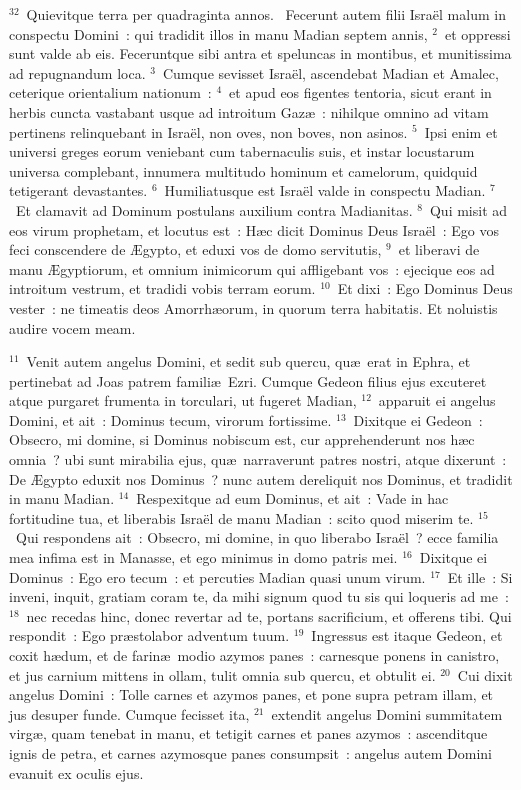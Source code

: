 ${}^{32}$~Quievitque terra per quadraginta annos.
~Fecerunt autem filii Isra\"el malum in conspectu Domini~: qui tradidit illos in manu Madian septem annis,
${}^{2}$~et oppressi sunt valde ab eis. Feceruntque sibi antra et speluncas in montibus, et munitissima ad repugnandum loca.
${}^{3}$~Cumque sevisset Isra\"el, ascendebat Madian et Amalec, ceterique orientalium nationum~:
${}^{4}$~et apud eos figentes tentoria, sicut erant in herbis cuncta vastabant usque ad introitum Gaz\ae~: nihilque omnino ad vitam pertinens relinquebant in Isra\"el, non oves, non boves, non asinos.
${}^{5}$~Ipsi enim et universi greges eorum veniebant cum tabernaculis suis, et instar locustarum universa complebant, innumera multitudo hominum et camelorum, quidquid tetigerant devastantes.
${}^{6}$~Humiliatusque est Isra\"el valde in conspectu Madian.
${}^{7}$~Et clamavit ad Dominum postulans auxilium contra Madianitas.
${}^{8}$~Qui misit ad eos virum prophetam, et locutus est~: H\ae c dicit Dominus Deus Isra\"el~: Ego vos feci conscendere de \AE gypto, et eduxi vos de domo servitutis,
${}^{9}$~et liberavi de manu \AE gyptiorum, et omnium inimicorum qui affligebant vos~: ejecique eos ad introitum vestrum, et tradidi vobis terram eorum.
${}^{10}$~Et dixi~: Ego Dominus Deus vester~: ne timeatis deos Amorrh\ae orum, in quorum terra habitatis. Et noluistis audire vocem meam.


${}^{11}$~Venit autem angelus Domini, et sedit sub quercu, qu\ae\ erat in Ephra, et pertinebat ad Joas patrem famili\ae\ Ezri. Cumque Gedeon filius ejus excuteret atque purgaret frumenta in torculari, ut fugeret Madian,
${}^{12}$~apparuit ei angelus Domini, et ait~: Dominus tecum, virorum fortissime.
${}^{13}$~Dixitque ei Gedeon~: Obsecro, mi domine, si Dominus nobiscum est, cur apprehenderunt nos h\ae c omnia~? ubi sunt mirabilia ejus, qu\ae\ narraverunt patres nostri, atque dixerunt~: De \AE gypto eduxit nos Dominus~? nunc autem dereliquit nos Dominus, et tradidit in manu Madian.
${}^{14}$~Respexitque ad eum Dominus, et ait~: Vade in hac fortitudine tua, et liberabis Isra\"el de manu Madian~: scito quod miserim te.
${}^{15}$~Qui respondens ait~: Obsecro, mi domine, in quo liberabo Isra\"el~? ecce familia mea infima est in Manasse, et ego minimus in domo patris mei.
${}^{16}$~Dixitque ei Dominus~: Ego ero tecum~: et percuties Madian quasi unum virum.
${}^{17}$~Et ille~: Si inveni, inquit, gratiam coram te, da mihi signum quod tu sis qui loqueris ad me~:
${}^{18}$~nec recedas hinc, donec revertar ad te, portans sacrificium, et offerens tibi. Qui respondit~: Ego pr\ae stolabor adventum tuum.
${}^{19}$~Ingressus est itaque Gedeon, et coxit h\ae dum, et de farin\ae\ modio azymos panes~: carnesque ponens in canistro, et jus carnium mittens in ollam, tulit omnia sub quercu, et obtulit ei.
${}^{20}$~Cui dixit angelus Domini~: Tolle carnes et azymos panes, et pone supra petram illam, et jus desuper funde. Cumque fecisset ita,
${}^{21}$~extendit angelus Domini summitatem virg\ae , quam tenebat in manu, et tetigit carnes et panes azymos~: ascenditque ignis de petra, et carnes azymosque panes consumpsit~: angelus autem Domini evanuit ex oculis ejus.


